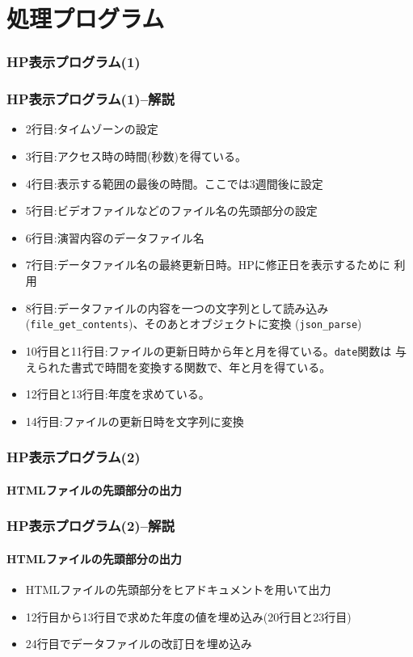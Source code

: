\section{処理プログラム}
\begin{frame}[containsverbatim]
 \frametitle{HP表示プログラム(1)}
\end{frame}
\begin{frame}[containsverbatim]
 \frametitle{HP表示プログラム(1)--解説}
\begin{itemize}
 \item 2行目:タイムゾーンの設定
 \item 3行目:アクセス時の時間(秒数)を得ている。
 \item 4行目:表示する範囲の最後の時間。ここでは3週間後に設定
 \item 5行目:ビデオファイルなどのファイル名の先頭部分の設定
 \item 6行目:演習内容のデータファイル名
 \item 7行目:データファイル名の最終更新日時。HPに修正日を表示するために
       利用
 \item 8行目:データファイルの内容を一つの文字列として読み込み
       (\Verb+file_get_contents+)、そのあとオブジェクトに変換
       (\Verb+json_parse+)
 \item 10行目と11行目:ファイルの更新日時から年と月を得ている。\Verb+date+関数は
       与えられた書式で時間を変換する関数で、年と月を得ている。
 \item 12行目と13行目:年度を求めている。
 \item 14行目:ファイルの更新日時を文字列に変換
\end{itemize}
\end{frame}
\begin{frame}[containsverbatim]
 \frametitle{HP表示プログラム(2)}
 \framesubtitle{HTMLファイルの先頭部分の出力}
\end{frame}
\begin{frame}[containsverbatim]
 \frametitle{HP表示プログラム(2)--解説}
 \framesubtitle{HTMLファイルの先頭部分の出力}
 \begin{itemize}
  \item HTMLファイルの先頭部分をヒアドキュメントを用いて出力
  \item 12行目から13行目で求めた年度の値を埋め込み(20行目と23行目)
  \item 24行目でデータファイルの改訂日を埋め込み
 \end{itemize}
\end{frame}

